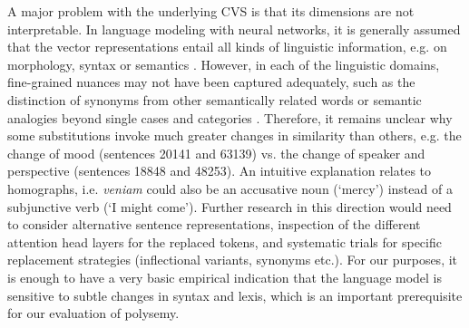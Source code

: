 \documentclass[oneside]{book}
\begin{document}
A major problem with the underlying \gls{CVS} is that its dimensions are not interpretable. In language modeling with neural networks, it is generally assumed that the vector representations entail all kinds of linguistic information, e.g. on morphology, syntax or semantics \parencites[8]{gladkovaAnalogybasedDetectionMorphological2016}[143]{rogersTooManyProblems2017}. However, in each of the linguistic domains, fine-grained nuances may not have been captured adequately, such as the distinction of synonyms from other semantically related words \parencite[115]{karanDistributionalSemanticsApproach2012} or semantic analogies beyond single cases and categories \parencite[142f.]{rogersTooManyProblems2017}. Therefore, it remains unclear why some substitutions invoke much greater changes in similarity than others, e.g. the change of mood (sentences 20141 and 63139) vs. the change of speaker and perspective (sentences 18848 and 48253). An intuitive explanation relates to homographs, i.e. \textit{veniam} could also be an accusative noun (`mercy') instead of a subjunctive verb (`I might come'). Further research in this direction would need to consider alternative sentence representations, inspection of the different attention head layers for the replaced tokens, and systematic trials for specific replacement strategies (inflectional variants, synonyms etc.). For our purposes, it is enough to have a very basic empirical indication that the language model is sensitive to subtle changes in syntax and lexis, which is an important prerequisite for our evaluation of polysemy.
\end{document}

